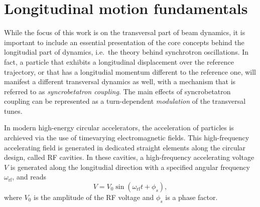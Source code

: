 
\section{Longitudinal motion fundamentals}

While the focus of this work is on the transversal part of beam dynamics, it is important to include an essential presentation of the core concepts behind the longitudial part of dynamics, i.e.\ the theory behind synchrotron oscillations. In fact, a particle that exhibits a longitudinal displacement over the reference trajectory, or that has a longitudial momentum different to the reference one, will manifest a different transversal dynamics as well, with a mechanism that is referred to as \textit{syncrobetatron coupling}. The main effects of syncrobetatron coupling can be represented as a turn-dependent \textit{modulation} of the transversal tunes.

In modern high-energy circular accelerators, the acceleration of particles is archieved via the use of timevarying electromagnetic fields. This high-frequency accelerating field is generated in dedicated straight elements along the circular design, called RF cavities. In these cavities, a high-frequency accelerating voltage $V$ is generated along the longitudial direction with a specified angular frequency $\omega_{\mathrm{rf}}$, and reads
\begin{equation}
    V=V_0 \sin \left(\omega_{\mathrm{rf}} t+\phi_s\right),
\end{equation}
where $V_0$ is the amplitude of the RF voltage and $\phi_s$ is a phase factor.

